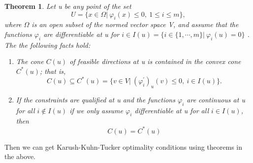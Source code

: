 \documentclass[a4paper,12pt]{report}
\newtheorem{theorem}{Theorem}[section]
\begin{document}
\begin{theorem}
    Let u be any point of the set
    \[
        U=\{x\in \Omega|\ \varphi_i(x)\leq0,\ 1\leq i\leq m\},
    \]
    where $\Omega$ is an open subset of the normed vector space V, and assume that the functions $\varphi_i$ are differentiable at u for $i\in I(u)=\{i\in\{1,\cdots,m\}|\ \varphi_i(u)=0\}$
. The the following facts hold:
    \begin{enumerate}[label={(\arabic*)}]
        \item The cone $C(u)$ of feasible directions at u is contained in the convex cone $C^*(u)$; that is,
            \[
                C(u)\subseteq C^*(u)=\{v\in V|\ (\varphi^\prime_i)_u(v)\leq 0, \ i\in I(u)\}.
            \]
        \item If the constraints are qualified at u and the functions $\varphi_i$ are continuous at u for all $i\notin I(u)$ if we only assume $\varphi_i$ differentiable at u for all $i\in I(u)$, then
            \[
                C(u)=C^*(u)
            \]
    \end{enumerate}
\end{theorem}


Then we can get Karush-Kuhn-Tucker optimality conditions using theorems in the above.
\end{document}
